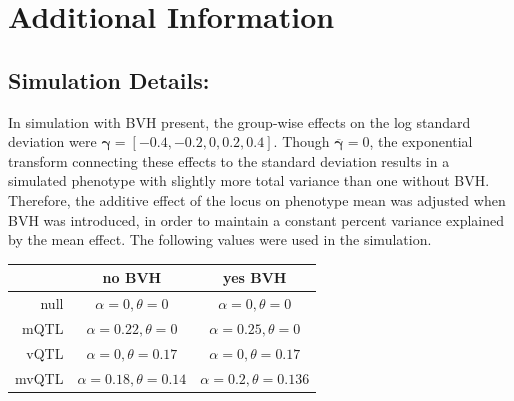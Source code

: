 

\section{Additional Information}

\subsection{Simulation Details:}

    In simulation with BVH present, the group-wise effects on the log standard deviation were $\bm{\gamma} = [-0.4, -0.2, 0, 0.2, 0.4]$.
    Though $\overline{\bm{\gamma}} = 0$, the exponential transform connecting these effects to the standard deviation results in a simulated phenotype with slightly more total variance than one without BVH.
    Therefore, the additive effect of the locus on phenotype mean was adjusted when BVH was introduced, in order to maintain a constant percent variance explained by the mean effect.
    The following values were used in the simulation.

    \begin{table}[ht]
        \begin{tabular}{rcc}
            \hline
                    & no BVH                                & yes BVH                        \\
            \hline
            null    & $\alpha = 0, \theta = 0$              & $\alpha = 0, \theta = 0$          \\
            mQTL    & $\alpha = 0.22, \theta = 0$           & $\alpha = 0.25, \theta = 0$          \\
            vQTL    & $\alpha = 0, \theta = 0.17$           & $\alpha = 0, \theta = 0.17$          \\
            mvQTL   & $\alpha = 0.18, \theta = 0.14$        & $\alpha = 0.2, \theta = 0.136$          \\
            \hline
        \end{tabular}
    \end{table}

